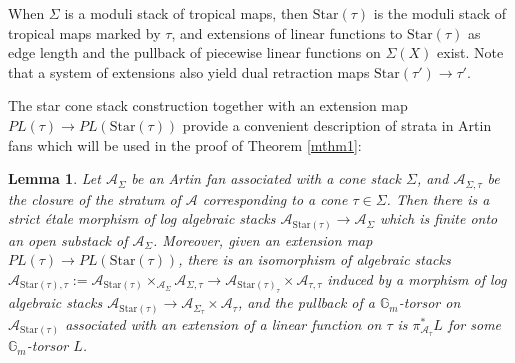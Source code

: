 \documentclass[12pt, oneside]{amsart}   	%
\newcounter{thm}
\newtheorem{lemma}[thm]{Lemma}
\numberwithin{equation}{section}
\numberwithin{thm}{section}
\numberwithin{figure}{section}
\begin{document}
When $\Sigma$ is a moduli stack of tropical maps, then $\text{Star}(\tau)$ is the moduli stack of tropical maps marked by $\tau$, and extensions of linear functions to $\text{Star}(\tau)$ as edge length and the pullback of piecewise linear functions on $\Sigma(X)$ exist. Note that a system of extensions also yield dual retraction maps $\text{Star}(\tau') \rightarrow \tau'$.

The star cone stack construction together with an extension map $PL(\tau) \rightarrow PL(\text{Star}(\tau))$ provide a convenient description of strata in Artin fans which will be used in the proof of Theorem \ref{mthm1}:

\begin{lemma}\label{stratadecomp}
Let $\mathcal{A}_{\Sigma}$ be an Artin fan associated with a cone stack $\Sigma$, and $\mathcal{A}_{\Sigma,\tau}$ be the closure of the stratum of $\mathcal{A}$ corresponding to a cone $\tau \in \Sigma$. Then there is a strict \'etale morphism of log algebraic stacks $\mathcal{A}_{\text{Star}(\tau)} \rightarrow \mathcal{A}_{\Sigma}$ which is finite onto an open substack of $ \mathcal{A}_{\Sigma}$. Moreover, given an extension map $PL(\tau) \rightarrow PL(\text{Star}(\tau))$, there is an isomorphism of algebraic stacks $\mathcal{A}_{\text{Star}(\tau),\tau}:= \mathcal{A}_{\text{Star}(\tau)}\times_{\mathcal{A}_{\Sigma}} \mathcal{A}_{\Sigma,\tau}\rightarrow \mathcal{A}_{\text{Star}(\tau)_{\tau}}\times \mathcal{A}_{\tau,\tau} $ induced by a morphism of log algebraic stacks $\mathcal{A}_{\text{Star}(\tau)}\rightarrow \mathcal{A}_{\Sigma_{\tau}}\times \mathcal{A}_{\tau} $, and the pullback of a $\mathbb{G}_m$-torsor on $\mathcal{A}_{\text{Star}(\tau)}$ associated with an extension of a linear function on $\tau$ is $\pi_{\mathcal{A}_{\tau}}^*L$ for some $\mathbb{G}_m$-torsor $L$.



\end{lemma}
\end{document}
